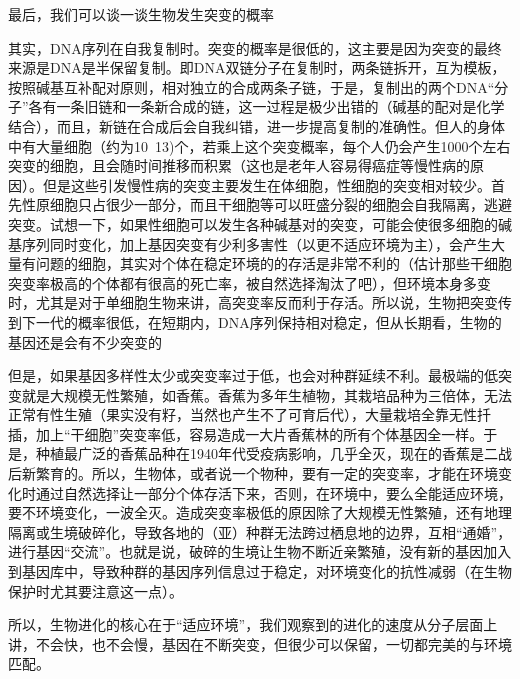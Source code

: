 \documentclass[UTF8]{ctexart}
\begin{document}
最后，我们可以谈一谈生物发生突变的概率\par
其实，DNA序列在自我复制时。突变的概率是很低的，这主要是因为突变的最终来源是DNA是半保留复制。即DNA双链分子在复制时，两条链拆开，互为模板，按照碱基互补配对原则，相对独立的合成两条子链，于是，复制出的两个DNA“分子”各有一条旧链和一条新合成的链，这一过程是极少出错的（碱基的配对是化学结合），而且，新链在合成后会自我纠错，进一步提高复制的准确性。但人的身体中有大量细胞（约为10\ 13)个，若乘上这个突变概率，每个人仍会产生1000个左右突变的细胞，且会随时间推移而积累（这也是老年人容易得癌症等慢性病的原因）。但是这些引发慢性病的突变主要发生在体细胞，性细胞的突变相对较少。首先性原细胞只占很少一部分，而且干细胞等可以旺盛分裂的细胞会自我隔离，逃避突变。试想一下，如果性细胞可以发生各种碱基对的突变，可能会使很多细胞的碱基序列同时变化，加上基因突变有少利多害性（以更不适应环境为主），会产生大量有问题的细胞，其实对个体在稳定环境的的存活是非常不利的（估计那些干细胞突变率极高的个体都有很高的死亡率，被自然选择淘汰了吧），但环境本身多变时，尤其是对于单细胞生物来讲，高突变率反而利于存活。所以说，生物把突变传到下一代的概率很低，在短期内，DNA序列保持相对稳定，但从长期看，生物的基因还是会有不少突变的\par
但是，如果基因多样性太少或突变率过于低，也会对种群延续不利。最极端的低突变就是大规模无性繁殖，如香蕉。香蕉为多年生植物，其栽培品种为三倍体，无法正常有性生殖（果实没有籽，当然也产生不了可育后代），大量栽培全靠无性扦插，加上“干细胞”突变率低，容易造成一大片香蕉林的所有个体基因全一样。于是，种植最广泛的香蕉品种在1940年代受疫病影响，几乎全灭，现在的香蕉是二战后新繁育的。所以，生物体，或者说一个物种，要有一定的突变率，才能在环境变化时通过自然选择让一部分个体存活下来，否则，在环境中，要么全能适应环境，要不环境变化，一波全灭。造成突变率极低的原因除了大规模无性繁殖，还有地理隔离或生境破碎化，导致各地的（亚）种群无法跨过栖息地的边界，互相“通婚”，进行基因“交流”。也就是说，破碎的生境让生物不断近亲繁殖，没有新的基因加入到基因库中，导致种群的基因序列信息过于稳定，对环境变化的抗性减弱（在生物保护时尤其要注意这一点）。\par
所以，生物进化的核心在于“适应环境”，我们观察到的进化的速度从分子层面上讲，不会快，也不会慢，基因在不断突变，但很少可以保留，一切都完美的与环境匹配。
\end{document}
